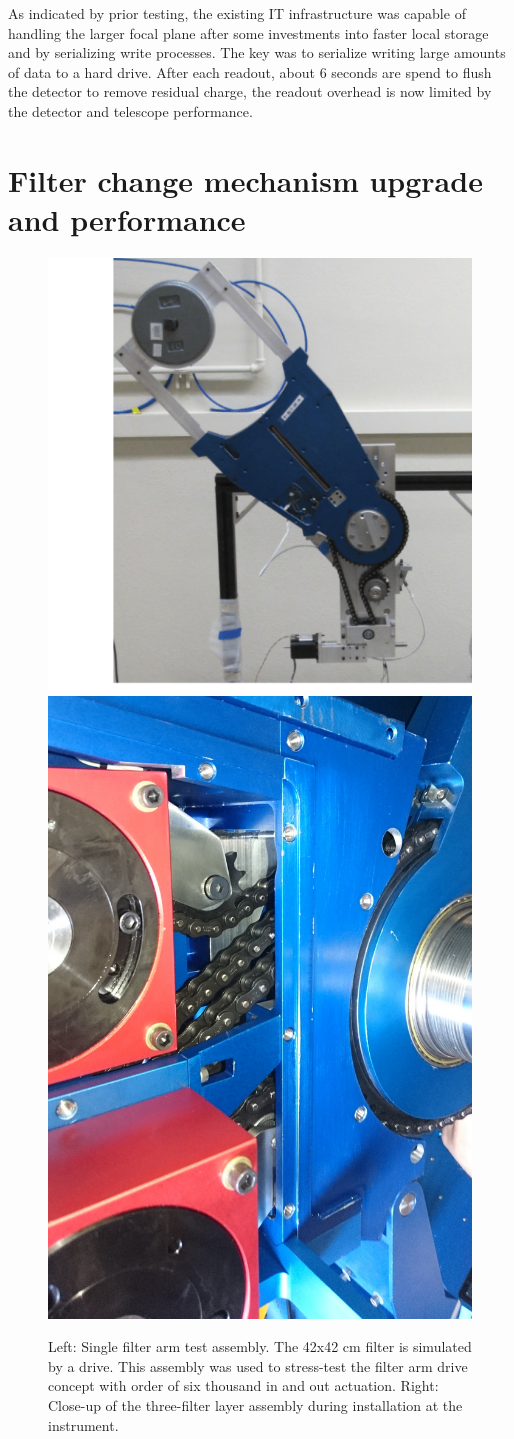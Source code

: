\documentclass[]{spieman}
\begin{document}
As indicated by prior testing, the existing IT infrastructure was capable of
handling the larger focal plane after some investments into faster local
storage and by serializing write processes. The key was to serialize writing
large amounts of data to a hard drive. After each readout, about 6 seconds
are spend to flush the detector to remove residual charge, the readout
overhead is now limited by the detector and telescope performance.


\section{Filter change mechanism upgrade and performance}


\begin{figure}[]
	\centering
	\hfill
	\includegraphics[height=0.49\textwidth]{images/filterdrivetest.png}
	\hfil
	\includegraphics[height=0.49\textwidth]{images/DSC_0309.JPG}
	\hfill
	\caption{\label{fig_filterdrive} Left: Single filter arm test assembly. The 
		42x42 cm filter is simulated by a drive. This assembly was used to 
		stress-test the filter arm drive concept with order of six thousand in 
		and 
		out actuation. Right: Close-up of the three-filter layer assembly 
		during 
		installation at the instrument.   }
\end{figure}
\end{document}
